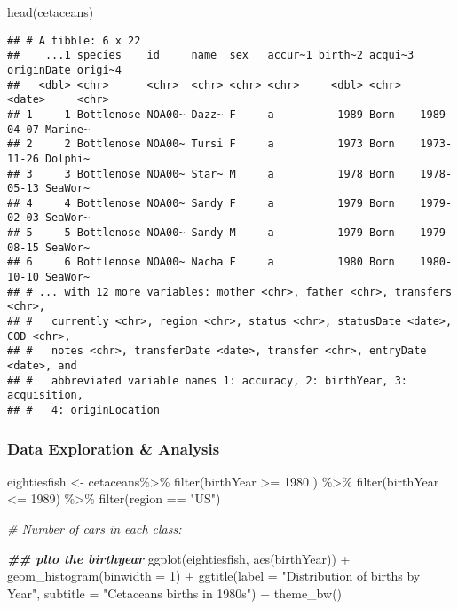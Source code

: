 \documentclass[
]{article}
\newenvironment{Shaded}{\begin{snugshade}}{\end{snugshade}}
\newcommand{\AttributeTok}[1]{\textcolor[rgb]{0.77,0.63,0.00}{#1}}
\newcommand{\CommentTok}[1]{\textcolor[rgb]{0.56,0.35,0.01}{\textit{#1}}}
\newcommand{\DecValTok}[1]{\textcolor[rgb]{0.00,0.00,0.81}{#1}}
\newcommand{\DocumentationTok}[1]{\textcolor[rgb]{0.56,0.35,0.01}{\textbf{\textit{#1}}}}
\newcommand{\FunctionTok}[1]{\textcolor[rgb]{0.00,0.00,0.00}{#1}}
\newcommand{\NormalTok}[1]{#1}
\newcommand{\OtherTok}[1]{\textcolor[rgb]{0.56,0.35,0.01}{#1}}
\newcommand{\SpecialCharTok}[1]{\textcolor[rgb]{0.00,0.00,0.00}{#1}}
\newcommand{\StringTok}[1]{\textcolor[rgb]{0.31,0.60,0.02}{#1}}
\begin{document}
\begin{Shaded}
\begin{Highlighting}[]
\FunctionTok{head}\NormalTok{(cetaceans)}
\end{Highlighting}
\end{Shaded}

\begin{verbatim}
## # A tibble: 6 x 22
##    ...1 species    id     name  sex   accur~1 birth~2 acqui~3 originDate origi~4
##   <dbl> <chr>      <chr>  <chr> <chr> <chr>     <dbl> <chr>   <date>     <chr>  
## 1     1 Bottlenose NOA00~ Dazz~ F     a          1989 Born    1989-04-07 Marine~
## 2     2 Bottlenose NOA00~ Tursi F     a          1973 Born    1973-11-26 Dolphi~
## 3     3 Bottlenose NOA00~ Star~ M     a          1978 Born    1978-05-13 SeaWor~
## 4     4 Bottlenose NOA00~ Sandy F     a          1979 Born    1979-02-03 SeaWor~
## 5     5 Bottlenose NOA00~ Sandy M     a          1979 Born    1979-08-15 SeaWor~
## 6     6 Bottlenose NOA00~ Nacha F     a          1980 Born    1980-10-10 SeaWor~
## # ... with 12 more variables: mother <chr>, father <chr>, transfers <chr>,
## #   currently <chr>, region <chr>, status <chr>, statusDate <date>, COD <chr>,
## #   notes <chr>, transferDate <date>, transfer <chr>, entryDate <date>, and
## #   abbreviated variable names 1: accuracy, 2: birthYear, 3: acquisition,
## #   4: originLocation
\end{verbatim}

\hypertarget{data-exploration-analysis}{%
\subsubsection{Data Exploration \&
Analysis}\label{data-exploration-analysis}}

\begin{Shaded}
\begin{Highlighting}[]
\NormalTok{eightiesfish }\OtherTok{\textless{}{-}}\NormalTok{ cetaceans}\SpecialCharTok{\%\textgreater{}\%} 
  \FunctionTok{filter}\NormalTok{(birthYear }\SpecialCharTok{\textgreater{}=} \DecValTok{1980}\NormalTok{ ) }\SpecialCharTok{\%\textgreater{}\%}
  \FunctionTok{filter}\NormalTok{(birthYear }\SpecialCharTok{\textless{}=} \DecValTok{1989}\NormalTok{) }\SpecialCharTok{\%\textgreater{}\%}
  \FunctionTok{filter}\NormalTok{(region }\SpecialCharTok{==} \StringTok{"US"}\NormalTok{)}


\CommentTok{\# Number of cars in each class:}

\DocumentationTok{\#\# plto the birthyear}
\FunctionTok{ggplot}\NormalTok{(eightiesfish, }\FunctionTok{aes}\NormalTok{(birthYear)) }\SpecialCharTok{+} \FunctionTok{geom\_histogram}\NormalTok{(}\AttributeTok{binwidth =} \DecValTok{1}\NormalTok{) }\SpecialCharTok{+} \FunctionTok{ggtitle}\NormalTok{(}\AttributeTok{label =} \StringTok{"Distribution of births by Year"}\NormalTok{, }\AttributeTok{subtitle =} \StringTok{"Cetaceans births in 1980s"}\NormalTok{) }\SpecialCharTok{+} \FunctionTok{theme\_bw}\NormalTok{()}
\end{Highlighting}
\end{Shaded}
\end{document}
